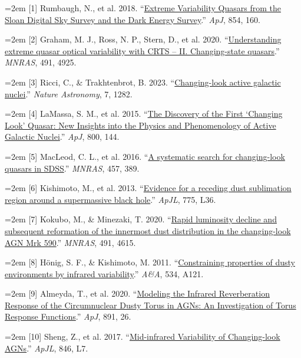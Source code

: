 \documentclass[12pt]{article}
\begin{document}
\noindent\hangindent=2em [1] Rumbaugh, N., et al. 2018. ``\href{https://doi.org/10.3847/1538-4357/aaa9b6}{Extreme Variability Quasars from the Sloan Digital Sky Survey and the Dark Energy Survey}.'' \emph{ApJ}, 854, 160.\par
\noindent\hangindent=2em [2] Graham, M. J., Ross, N. P., Stern, D., et al. 2020. ``\href{https://doi.org/10.1093/mnras/stz3244}{Understanding extreme quasar optical variability with CRTS -- II. Changing-state quasars}.'' \emph{MNRAS}, 491, 4925.\par
\noindent\hangindent=2em [3] Ricci, C., \& Trakhtenbrot, B. 2023. ``\href{https://doi.org/10.1038/s41550-023-02108-4}{Changing-look active galactic nuclei}.'' \emph{Nature Astronomy}, 7, 1282.\par
\noindent\hangindent=2em [4] LaMassa, S. M., et al. 2015. ``\href{https://doi.org/10.1088/0004-637x/800/2/144}{The Discovery of the First `Changing Look' Quasar: New Insights into the Physics and Phenomenology of Active Galactic Nuclei}.'' \emph{ApJ}, 800, 144.\par
\noindent\hangindent=2em [5] MacLeod, C. L., et al. 2016. ``\href{https://doi.org/10.1093/mnras/stv2997}{A systematic search for changing-look quasars in SDSS}.'' \emph{MNRAS}, 457, 389.\par
\noindent\hangindent=2em [6] Kishimoto, M., et al. 2013. ``\href{https://doi.org/10.1088/2041-8205/775/2/L36}{Evidence for a receding dust sublimation region around a supermassive black hole}.'' \emph{ApJL}, 775, L36.\par
\noindent\hangindent=2em [7] Kokubo, M., \& Minezaki, T. 2020. ``\href{https://doi.org/10.1093/mnras/stz3397}{Rapid luminosity decline and subsequent reformation of the innermost dust distribution in the changing-look AGN Mrk 590}.'' \emph{MNRAS}, 491, 4615.\par
\noindent\hangindent=2em [8] H\"onig, S. F., \& Kishimoto, M. 2011. ``\href{https://doi.org/10.1051/0004-6361/201117750}{Constraining properties of dusty environments by infrared variability}.'' \emph{A\&A}, 534, A121.\par
\noindent\hangindent=2em [9] Almeyda, T., et al. 2020. ``\href{https://doi.org/10.3847/1538-4357/ab6aa1}{Modeling the Infrared Reverberation Response of the Circumnuclear Dusty Torus in AGNs: An Investigation of Torus Response Functions}.'' \emph{ApJ}, 891, 26.\par
\noindent\hangindent=2em [10] Sheng, Z., et al. 2017. ``\href{https://doi.org/10.3847/2041-8213/aa85de}{Mid-infrared Variability of Changing-look AGNs}.'' \emph{ApJL}, 846, L7.\par
\end{document}
